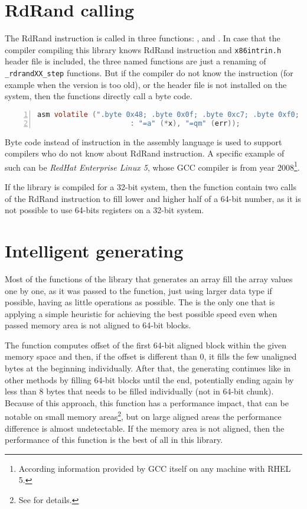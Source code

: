 \section{RdRand calling}
The RdRand instruction is called in three functions: ,  and . In case that the compiler compiling this library knows RdRand instruction and {\tt x86intrin.h} header file is included, the three named functions are just a renaming of {\tt \_rdrandXX\_step} functions. But if the compiler do not know the instruction (for example when the version is too old), or the header file is not installed on the system, then the functions directly call a byte code.
\begin{lstlisting}[frame=none, basicstyle=\footnotesize\ttfamily, language=C, numbers=left, numberstyle=\tiny\color{black},caption= {Byte code called in {\tt rdrand64\_step}.}]
 asm volatile (".byte 0x48; .byte 0x0f; .byte 0xc7; .byte 0xf0; setc %1"
                      : "=a" (*x), "=qm" (err));
\end{lstlisting}

Byte code instead of instruction in the assembly language is used to support compilers who do not know about RdRand instruction. A specific example of such can be {\em RedHat Enterprise Linux 5}, whose GCC compiler is from year 2008\footnote{According information provided by GCC itself on any machine with RHEL 5.}. 

If the library is compiled for a 32-bit system, then the  function contain two calls of the RdRand instruction to fill lower and higher half of a 64-bit number, as it is not possible to use 64-bits registers on a 32-bit system. 

\section{Intelligent generating}
Most of the functions of the library that generates an array fill the array values one by one, as it was passed to the function, just using larger data type if possible, having as little operations as possible. The  is the only one that is applying a simple heuristic for achieving the best possible speed even when passed memory area is not aligned to 64-bit blocks.

The function computes offset of the first 64-bit aligned block within the given memory space and then, if the offset is different than 0, it fills the few unaligned bytes at the beginning individually. After that, the generating continues like in other methods by filling 64-bit blocks until the end, potentially ending again by less than 8 bytes that needs to be filled individually (not in 64-bit chunk). Because of this approach, this function has a performance impact, that can be notable on small memory areas\footnote{See  for details.}, but on large aligned areas the performance difference is almost undetectable. If the memory area is not aligned, then the performance of this function is the best of all in this library.


